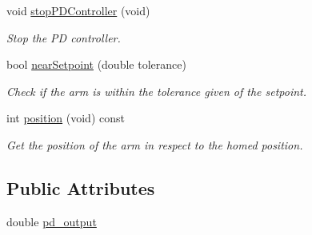 \begin{DoxyCompactItemize}
void \hyperlink{class_arm_a387289c28547f8e7eccdb085afddb43a}{stop\+P\+D\+Controller} (void)
\begin{DoxyCompactList}\small\item\em Stop the PD controller. \end{DoxyCompactList}\item 
bool \hyperlink{class_arm_a392a83624fdebcb6269695c3600e6c90}{near\+Setpoint} (double tolerance)
\begin{DoxyCompactList}\small\item\em Check if the arm is within the tolerance given of the setpoint. \end{DoxyCompactList}\item 
int \hyperlink{class_arm_a2688295ef2029461e65723d1563f7a28}{position} (void) const
\begin{DoxyCompactList}\small\item\em Get the position of the arm in respect to the homed position. \end{DoxyCompactList}\end{DoxyCompactItemize}
\subsection*{Public Attributes}
\begin{DoxyCompactItemize}
\item 
double \hyperlink{class_arm_a75af15c369c67a1563f198e029bae1e4}{pd\+\_\+output}
\end{DoxyCompactItemize}
